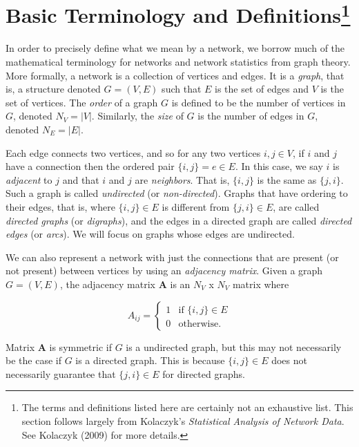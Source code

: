 \documentclass[12pt,twoside]{amherstthesis}
\begin{document}
  \section[Basic Terminology and Definitions]{\texorpdfstring{Basic
  Terminology and Definitions\footnote{The terms and definitions listed
    here are certainly not an exhaustive list. This section follows
    largely from Kolaczyk's \emph{Statistical Analysis of Network Data}.
    See Kolaczyk (2009) for more details.}}{Basic Terminology and Definitions}}\label{basic-terminology-and-definitions-1}
  
  In order to precisely define what we mean by a network, we borrow much
  of the mathematical terminology for networks and network statistics from
  graph theory. More formally, a network is a collection of vertices and
  edges. It is a \emph{graph}, that is, a structure denoted \(G = (V, E)\)
  such that \(E\) is the set of edges and \(V\) is the set of vertices.
  The \emph{order} of a graph \(G\) is defined to be the number of
  vertices in \(G\), denoted \(N_V = |V|\). Similarly, the \emph{size} of
  \(G\) is the number of edges in \(G\), denoted \(N_E = |E|\).
  
  Each edge connects two vertices, and so for any two vertices
  \(i, j \in V\), if \(i\) and \(j\) have a connection then the ordered
  pair \(\{i, j\} = e \in E\). In this case, we say \(i\) is
  \emph{adjacent} to \(j\) and that \(i\) and \(j\) are \emph{neighbors}.
  That is, \(\{i, j\}\) is the same as \(\{j, i\}\). Such a graph is
  called \emph{undirected} (or \emph{non-directed}). Graphs that have
  ordering to their edges, that is, where \(\{i, j\} \in E\) is different
  from \(\{j, i\} \in E\), are called \emph{directed graphs} (or
  \emph{digraphs}), and the edges in a directed graph are called
  \emph{directed edges} (or \emph{arcs}). We will focus on graphs whose
  edges are undirected.
  
  We can also represent a network with just the connections that are
  present (or not present) between vertices by using an \emph{adjacency
  matrix}. Given a graph \(G = (V, E)\), the adjacency matrix
  \(\textbf{A}\) is an \(N_V\) x \(N_V\) matrix where
  
  \[ A_{ij} = \begin{cases}
      1 & \text{if } \{i, j\} \in E \\
      0 & \text{otherwise.} 
    \end{cases}
  \]
  
  Matrix \(\textbf{A}\) is symmetric if \(G\) is a undirected graph, but
  this may not necessarily be the case if \(G\) is a directed graph. This
  is because \(\{i, j\} \in E\) does not necessarily guarantee that
  \(\{j, i\} \in E\) for directed graphs.
  
\end{document}
